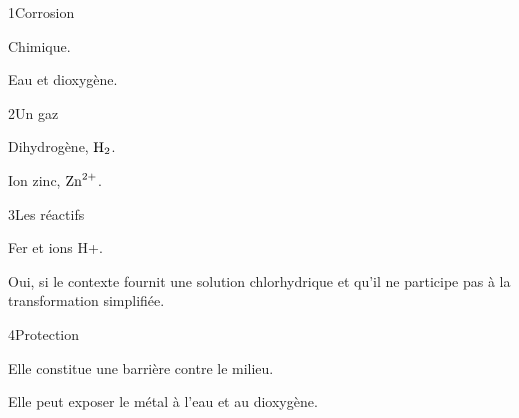 \par\noindent\begin{minipage}{\linewidth}
\begin{corrige}{1}{Corrosion}
\begin{questions}
\item Chimique.
\item Eau et dioxygène.
\end{questions}
\end{corrige}
\end{minipage}
\par\noindent\begin{minipage}{\linewidth}
\begin{corrige}{2}{Un gaz}
\begin{questions}
\item Dihydrogène, $\ce{H2}$.
\item Ion zinc, $\ce{Zn^{2+}}$.
\end{questions}
\end{corrige}
\end{minipage}
\par\noindent\begin{minipage}{\linewidth}
\begin{corrige}{3}{Les réactifs}
\begin{questions}
\item Fer et ions H+.
\item Oui, si le contexte fournit une solution chlorhydrique et qu’il ne participe pas à la transformation simplifiée.
\end{questions}
\end{corrige}
\end{minipage}
\par\noindent\begin{minipage}{\linewidth}
\begin{corrige}{4}{Protection}
\begin{questions}
\item Elle constitue une barrière contre le milieu.
\item Elle peut exposer le métal à l’eau et au dioxygène.
\end{questions}
\end{corrige}
\end{minipage}
